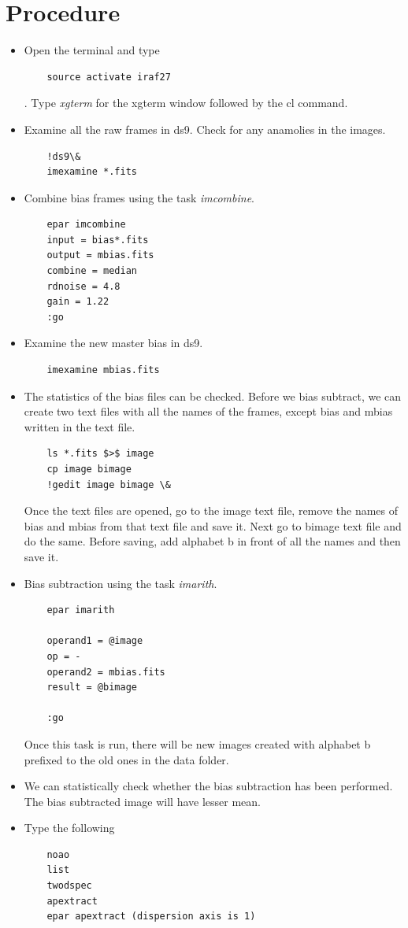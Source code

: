 \documentclass[letterpaper,11pt]{report}
\begin{document}
\section{Procedure}
\begin{itemize}
    \item Open the terminal and type 
    \begin{lstlisting}
    source activate iraf27
    \end{lstlisting}
    . Type \emph{xgterm} for the xgterm window followed by the cl command.
    \item Examine all the raw frames in ds9. Check for any anamolies in the images.
    \begin{lstlisting}
    !ds9\&
    imexamine *.fits
     \end{lstlisting}
    \item  Combine bias frames using the task \emph{imcombine}.
    \begin{lstlisting}
    epar imcombine
    input = bias*.fits
    output = mbias.fits
    combine = median
    rdnoise = 4.8
    gain = 1.22
    :go
     \end{lstlisting}
    \item  Examine the new master bias in ds9.
    
    \begin{lstlisting}
    imexamine mbias.fits
    \end{lstlisting}
    \item The statistics of the bias files can be checked. Before we bias subtract, we can create two text files with all the names of the frames, except bias and mbias written in the text file.  
    \begin{lstlisting}
    ls *.fits $>$ image
    cp image bimage
    !gedit image bimage \&
     \end{lstlisting}
    
    Once the text files are opened, go to the image text file, remove the names of bias and  mbias from that text file and save it. Next go to bimage text file and do the same. Before saving,  add alphabet b in front of all the names and then save it.  
    \item  Bias subtraction using the task \emph{imarith}.
    \begin{lstlisting}
    epar imarith
    
    operand1 = @image
    op = -
    operand2 = mbias.fits
    result = @bimage
    
    :go
     \end{lstlisting}
     Once this task is run, there will be new images created with alphabet b prefixed to the old  ones in the data folder.
    \item We can statistically check whether the bias subtraction has been performed. The bias subtracted image will have  lesser mean.  
    \item Type the following
    \begin{lstlisting}
    noao
    list
    twodspec
    apextract
    epar apextract (dispersion axis is 1)
    

\end{lstlisting}
\end{itemize}
\end{document}

